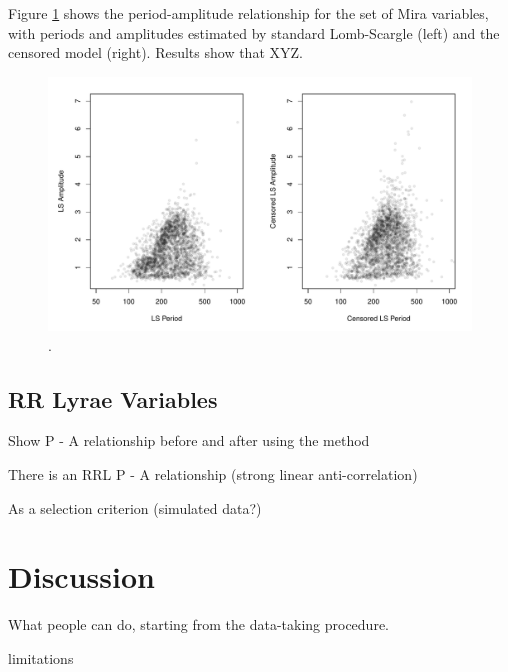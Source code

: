 \documentclass[12pt,preprint]{aastex}
\begin{document}
Figure \ref{fig:miraPA} shows the period-amplitude relationship for the set of Mira variables, with periods and amplitudes estimated by standard Lomb-Scargle (left) and the censored model (right).  Results show that XYZ.
 
\begin{figure}
\begin{center}
\includegraphics[angle=0,width=6.5in]{../plots/mira_period_amplitude_relation.pdf}
\end{center}
\caption{ .  \label{fig:miraPA}}
\end{figure}



 \subsection{RR Lyrae Variables}

  Show P - A relationship before and after using the method

There is an RRL P - A relationship (strong linear anti-correlation)

As a selection criterion (simulated data?)


\section{Discussion}
\label{sec:discussion}

What people can do, starting from the data-taking procedure.

limitations



\acknowledgements



\end{document}

